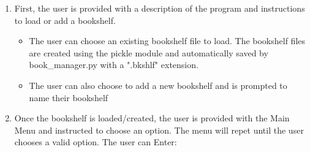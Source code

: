 \documentclass[11pt]{article}
\providecommand{\tightlist}{%
      \setlength{\itemsep}{0pt}\setlength{\parskip}{0pt}}
\begin{document}
\begin{enumerate}
\def\labelenumi{\arabic{enumi}.}
\tightlist
\item
  First, the user is provided with a description of the program and
  instructions to load or add a bookshelf.

  \begin{itemize}
  \tightlist
  \item
    The user can choose an existing bookshelf file to load. The
    bookshelf files are created using the pickle module and
    automatically saved by book\_manager.py with a ".bkshlf" extension.
  \item
    The user can also choose to add a new bookshelf and is prompted to
    name their bookshelf
  \end{itemize}
\item
  Once the bookshelf is loaded/created, the user is provided with the
  Main Menu and instructed to choose an option. The menu will repet
  until the user chooses a valid option. The user can Enter:


\end{enumerate}
\end{document}
